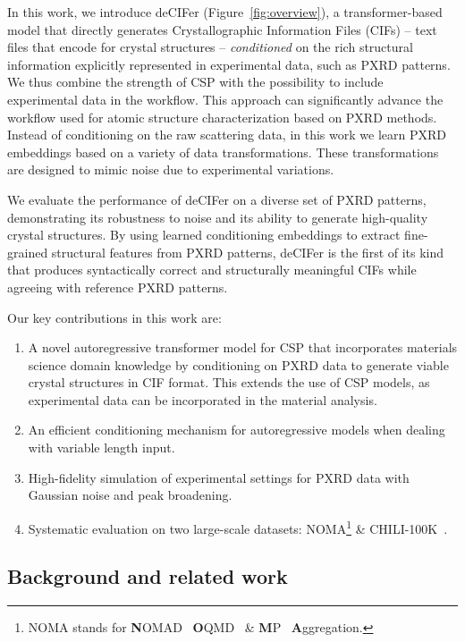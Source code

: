 In this work, we introduce deCIFer (Figure~\ref{fig:overview}), a transformer-based model that directly generates Crystallographic Information Files (CIFs) -- text files that encode for crystal structures -- {\em conditioned} on the rich structural information explicitly represented in experimental data, such as PXRD patterns. We thus combine the strength of CSP with the possibility to include experimental data in the workflow. This approach can significantly advance the workflow used for atomic structure characterization based on PXRD methods. Instead of conditioning on the raw scattering data, in this work we learn PXRD embeddings based on a variety of data transformations. These transformations are designed to mimic noise due to experimental variations. 

We evaluate the performance of deCIFer on a diverse set of PXRD patterns, demonstrating its robustness to noise and its ability to generate high-quality crystal structures. By using learned conditioning embeddings to extract fine-grained structural features from PXRD patterns, deCIFer is the first of its kind that produces syntactically correct and structurally meaningful CIFs while agreeing with reference PXRD patterns.

Our key contributions in this work are:
\vspace{-0.35cm}
\begin{enumerate}
    \itemsep0em 
    \item  A novel autoregressive transformer model for CSP that incorporates materials science domain knowledge by conditioning on PXRD data to generate viable crystal structures in CIF format. This extends the use of CSP models, as experimental data can be incorporated in the material analysis.
    \item An efficient conditioning mechanism for autoregressive models when dealing with variable length input.
    \item High-fidelity simulation of experimental settings for PXRD data with Gaussian noise and peak broadening. 
    \item Systematic evaluation on two large-scale datasets: NOMA\footnote{NOMA stands for \textbf{N}OMAD~\cite{nomad2019} \textbf{O}QMD~\cite{kirklin2015open} \& \textbf{M}P~\cite{materialsproject2013} \textbf{A}ggregation.
    }
    \& CHILI-100K~\cite{FriisJensenJohansen2024}.
\end{enumerate}

\subsection*{Background and related work} 

